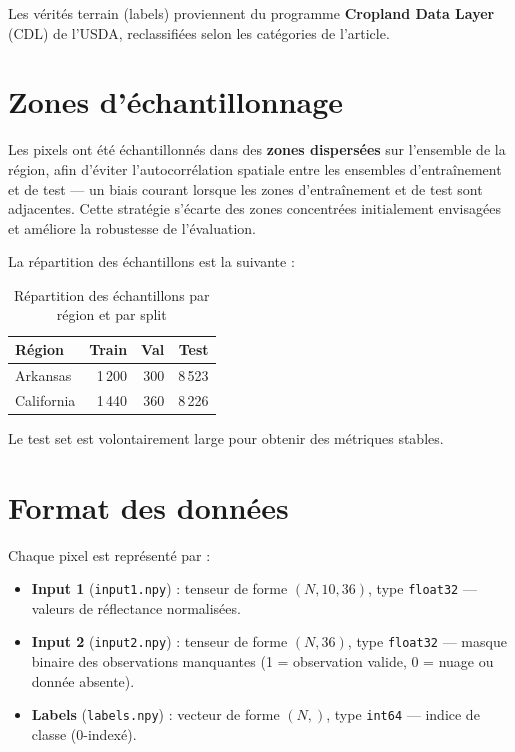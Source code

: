 Les vérités terrain (labels) proviennent du programme
\textbf{Cropland Data Layer} (CDL) de l'USDA, reclassifiées selon les
catégories de l'article.

\section{Zones d'échantillonnage}

Les pixels ont été échantillonnés dans des \textbf{zones dispersées} sur
l'ensemble de la région, afin d'éviter l'autocorrélation spatiale entre les
ensembles d'entraînement et de test — un biais courant lorsque les zones
d'entraînement et de test sont adjacentes. Cette stratégie s'écarte des
zones concentrées initialement envisagées et améliore la robustesse de
l'évaluation.

La répartition des échantillons est la suivante :

\begin{table}[H]
\centering
\caption{Répartition des échantillons par région et par split}
\label{tab:splits}
\begin{tabular}{lrrr}
\toprule
\textbf{Région} & \textbf{Train} & \textbf{Val} & \textbf{Test} \\
\midrule
Arkansas    & 1\,200 & 300 & 8\,523 \\
California  & 1\,440 & 360 & 8\,226 \\
\bottomrule
\end{tabular}
\end{table}

Le test set est volontairement large pour obtenir des métriques stables.

\section{Format des données}

Chaque pixel est représenté par :
\begin{itemize}
  \item \textbf{Input 1} (\texttt{input1.npy}) : tenseur de forme $(N, 10, 36)$,
        type \texttt{float32} — valeurs de réflectance normalisées.
  \item \textbf{Input 2} (\texttt{input2.npy}) : tenseur de forme $(N, 36)$,
        type \texttt{float32} — masque binaire des observations manquantes
        (1 = observation valide, 0 = nuage ou donnée absente).
  \item \textbf{Labels} (\texttt{labels.npy}) : vecteur de forme $(N,)$,
        type \texttt{int64} — indice de classe (0-indexé).
\end{itemize}

